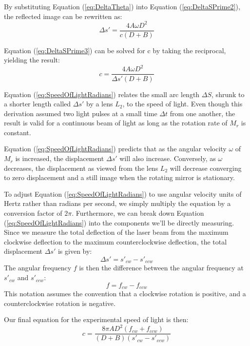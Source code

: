 \documentclass[twocolumn]{article}
\begin{document}
	By substituting Equation (\ref{eq:DeltaTheta}) into Equation (\ref{eq:DeltaSPrime2}), the reflected image can be rewritten as:
	\begin{equation}
		\Delta s' = \frac{4A\omega D^2}{c(D+B)}
		\label{eq:DeltaSPrime3}
	\end{equation}
	
	Equation (\ref{eq:DeltaSPrime3}) can be solved for c by taking the reciprocal, yielding the result:
	\begin{equation}
		c = \frac{4A\omega D^2}{\Delta s'(D+B)}
		\label{eq:SpeedOfLightRadians}
	\end{equation}
	
	Equation (\ref{eq:SpeedOfLightRadians}) relates the small arc length $\Delta S$, shrunk to a shorter length called $\Delta s'$ by a lens $L_2$, to the speed of light. 
	Even though this derivation assumed two light pulses at a small time $\Delta t$ from one another, the result is valid for a continuous beam of light as long as the rotation rate of $M_r$ is constant. 
	
	Equation (\ref{eq:SpeedOfLightRadians}) predicts that as the angular velocity $\omega$ of $M_r$ is increased, the displacement $\Delta s'$ will also increase. 
	Conversely, as $\omega$ decreases, the displacement as viewed from the lens $L_2$ will decrease converging to zero displacement and a still image when the rotating mirror is stationary. 
	
	To adjust Equation (\ref{eq:SpeedOfLightRadians}) to use angular velocity units of Hertz rather than radians per second, we simply multiply the equation by a conversion factor of $2\pi$.
	Furthermore, we can break down Equation (\ref{eq:SpeedOfLightRadians}) into the components we'll be directly measuring.
	Since we measure the total deflection of the laser beam from the maximum clockwise deflection to the maximum counterclockwise deflection, the total displacement $\Delta s'$ is given by:
	\begin{equation}
		\Delta s' = s'_{cw} - s'_{ccw}
	\end{equation} 
	The angular frequency $f$ is then the difference between the angular frequency at $s'_{cw}$ and $s'_{ccw}$:
	\begin{equation}
		f = f_{cw} - f_{ccw}
	\end{equation}
	This notation assumes the convention that a clockwise rotation is positive, and a counterclockwise rotation is negative.
	
	Our final equation for the experimental speed of light is then:
	\begin{equation} \label{eq:SpeedofLightCalc1}
	c = \frac{ 8\pi AD^2 (f_{cw} + f_{ccw})}
	{ (D + B) (s'_{cw} - s'_{ccw})}
	\end{equation}
	
\end{document}
